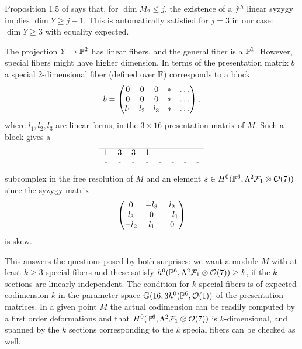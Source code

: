 Proposition 1.5 of \cite{CO:Gr1} says that, for $\dim M_2 \le j$,
the existence of a $j^{th}$ linear syzygy implies $\dim Y \ge j-1$. 
This is automatically satisfied for $j=3$
in our case: $\dim Y \ge 3$ with equality expected. 

The projection $Y \to {\mathbb P}^2$ has linear fibers, and the general fiber is a 
${\mathbb P}^1$. However, special fibers might have higher dimension. In terms
of the presentation matrix $b$ a special 2-dimensional fiber (defined
over ${\mathbb F}$) corresponds to a block
$$
b=\begin{pmatrix}
0 & 0 & 0 & * & \ldots \cr
0 & 0 & 0 & * & \ldots \cr
l_1 & l_2 & l_3 & *& \ldots \cr 
\end{pmatrix},
$$
where $l_1,l_2,l_3$ are linear forms, in the $3\times16$ presentation matrix of $M$.
Such a block gives a 
$$
\begin{tabular}{|cccccccc}
\hline
1 & 3 & 3 & 1 & - & - & - &- \cr
- & - & - & - & - & - & - & - \cr
\end{tabular}
$$
subcomplex in the free resolution of $M$ and an element 
$s \in H^0({\mathbb P}^6,\Lambda^2 {\mathcal F}_1 \otimes {\mathcal O}(7))$
since the syzygy matrix
$$
\begin{pmatrix}
0 & -l_3 & l_2  \cr
l_3 & 0 & -l_1  \cr
-l_2 & l_1 & 0  \cr 
\end{pmatrix}
$$
is skew. 

This answers the questions posed by both surprises: 
we want a module $M$ with at least $k \ge 3$ special
fibers and these satisfy $h^0({\mathbb P}^6,\Lambda^2 {\mathcal F}_1 \otimes {\mathcal O}(7)) \ge k$, 
if the $k$ sections are linearly independent. 
The condition for $k$ special fibers is of expected codimension $k$ in the
parameter space ${\mathbb G}(16,3h^0({\mathbb P}^6,{\mathcal O}(1))$ of the presentation matrices.
In a given point $M$ the actual codimension can be readily computed
by a first order deformations and that 
$H^0({\mathbb P}^6,\Lambda^2 {\mathcal F}_1 \otimes {\mathcal O}(7))$ is $k$-dimensional, and spanned by the
$k$ sections corresponding to the $k$ special fibers can be checked as well. 

